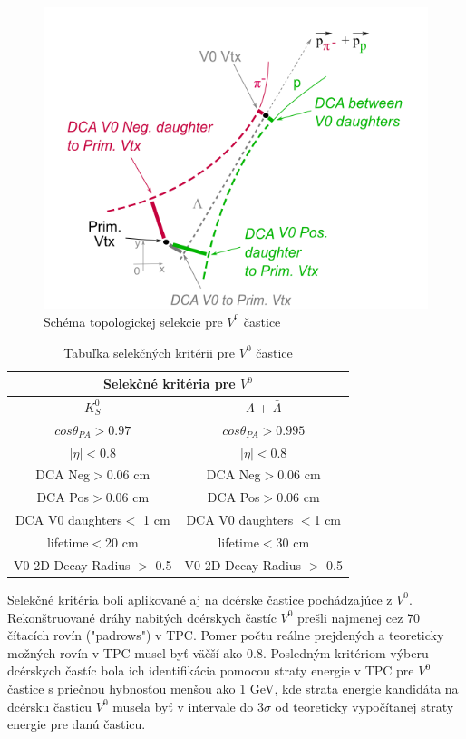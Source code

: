 \documentclass[thesismargins, thesislinespacing]{rnthesis}
\begin{document}
\begin{figure}[hbtp!]
	\centering
	\includegraphics[scale=0.8]{./Obrazky_praca/SchemaV0.png}
	\caption{Schéma topologickej selekcie pre $V^0$ častice~\cite{schema}}
	\label{schema} 
\end{figure}

\begin{table}[hbtp!]
	\begin{center}
		\begin{tabular}{|c|c|}
			\hline
			 \multicolumn{2}{|c|}{Selekčné kritéria pre $V^{0}$}  \\ \hline
			$K^0_S$ & $\Lambda$ + $\bar{\Lambda}$ \\ \hline
			$cos\theta_{PA} >0.97$ & $cos\theta_{PA} >0.995$  \\ \hline
			$|\eta|<0.8$ & $|\eta|<0.8$   \\ \hline
			DCA Neg$>$0.06 cm & DCA Neg$>$0.06 cm \\ \hline
			DCA Pos$>$0.06 cm & DCA Pos$>$0.06 cm \\ \hline
			DCA V0 daughters$<$ 1 cm & DCA V0 daughters $<$1 cm \\ \hline
			lifetime$<$20 cm & lifetime$<$30 cm \\ \hline
			V0 2D Decay Radius $>$ 0.5 & V0 2D Decay Radius $>$ 0.5\\ 
			\hline
		\end{tabular}
		\caption{Tabuľka selekčných kritérii pre $V^{0}$ častice}
		\label{tabulka}
	\end{center}
\end{table}
\newpage
Selekčné kritéria boli aplikované aj na dcérske častice pochádzajúce z $V^0$. Rekonštruované dráhy nabitých dcérskych častíc $V^0$ prešli najmenej cez 70 čítacích rovín ("padrows") v TPC. Pomer počtu reálne prejdených a teoreticky možných rovín v TPC musel byť väčší ako 0.8. Posledným kritériom výberu dcérskych častíc bola ich identifikácia pomocou straty energie v TPC pre $V^0$ častice s priečnou hybnosťou menšou ako 1 GeV, kde strata energie kandidáta na dcérsku časticu $V^0$ musela byť v intervale do $3\sigma$ od teoreticky vypočítanej straty energie pre danú časticu.
\end{document}
